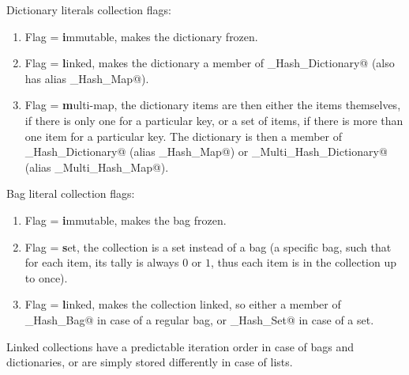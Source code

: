 Dictionary literals collection flags:

\begin{enumerate}
\item Flag \lstinline@i@ = \textbf{i}mmutable, makes the dictionary frozen. 
\item Flag \lstinline@l@ = \textbf{l}inked, makes the dictionary a member of \lstinline@Linked_Hash_Dictionary@ (also has alias \lstinline@Linked_Hash_Map@).
\item Flag \lstinline@m@ = \textbf{m}ulti-map, the dictionary items are then either the items themselves, if there is only one for a particular key, or a set of items, if there is more than one item for a particular key. The dictionary is then a member of \lstinline@Multi_Hash_Dictionary@ (alias \lstinline@Multi_Hash_Map@) or \lstinline@Linked_Multi_Hash_Dictionary@ (alias \lstinline@Linked_Multi_Hash_Map@). 
\end{enumerate}

Bag literal collection flags:

\begin{enumerate}
\item Flag \lstinline@i@ = \textbf{i}mmutable, makes the bag frozen. 
\item Flag \lstinline@s@ = \textbf{s}et, the collection is a set instead of a bag (a specific bag, such that for each item, its tally is always $0$ or $1$, thus each item is in the collection up to once). 
\item Flag \lstinline@l@ = \textbf{l}inked, makes the collection linked, so either a member of \lstinline@Linked_Hash_Bag@ in case of a regular bag, or \lstinline@Linked_Hash_Set@ in case of a set. 
\end{enumerate}

Linked collections have a predictable iteration order in case of bags and dictionaries, or are simply stored differently in case of lists. 

